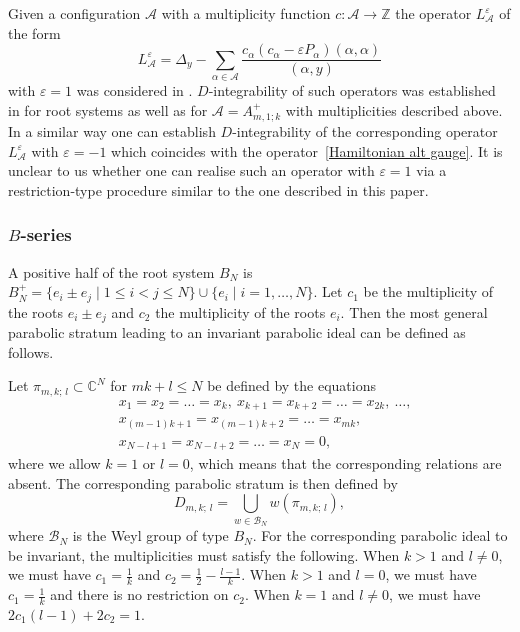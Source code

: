 \documentclass[12pt]{amsart}
\numberwithin{equation}{section}
\theoremstyle{definition}
\begin{document}
Given a configuration $\mathcal A$ with a multiplicity function $c\colon {\mathcal A}\to {\mathbb Z}$ the operator 
$L_{\mathcal A}^\varepsilon$ of the form 
\begin{equation}
\label{Lepsilon}
L_{\mathcal A}^\varepsilon=\Delta_y - \sum_{\alpha\in \mathcal A} \frac{c_\alpha(c_\alpha - \varepsilon P_\alpha)(\alpha, \alpha)}{(\alpha,y)} 
\end{equation}
with $\varepsilon =1$ 
was considered in \cite{CGV}. $D$-integrability of such operators was established in \cite{CGV} for root systems as well as for ${\mathcal A}=A^+_{m,1; k}$ with multiplicities described above. In a similar way one can establish $D$-integrability of the corresponding operator $L_{\mathcal A}^\varepsilon$ with $\varepsilon=-1$ which coincides with the operator~\eqref{Hamiltonian alt gauge}. It is unclear to us whether one can realise such an operator with $\varepsilon =1$ via a restriction-type procedure similar to the one described in this paper. 


\subsubsection{$B$-series}\label{rat type B}
A positive half of the root system $B_N$ is $B_N^+ = \{ e_i \pm e_j \mid 1 \leq i < j \leq N\} \cup \{ e_i  \mid i= 1, \dots, N\}$.
Let $c_1$ be the multiplicity of the roots $e_i \pm e_j$ and $c_2$ the multiplicity of the roots $e_i$. Then the most general parabolic 
stratum leading to an invariant parabolic ideal can be defined as follows. 

Let $\pi_{m,k;\, l} \subset \mathbb{C}^N$ for $mk+l \leq N$ be defined by the equations
\begin{align*}
    &x_1 = x_2 = \dots = x_k, \ x_{k+1} = x_{k + 2} = \dots = x_{2k}, \ \dots, \\
    &x_{(m-1)k+1} = x_{(m-1)k+2} = \dots = x_{mk}, \\
    &x_{N - l + 1} = x_{N - l + 2} = \dots = x_{N} = 0,    
\end{align*}
where we allow $k=1$ or $l=0$, which means that the corresponding relations are absent. The corresponding parabolic stratum is then defined by
\begin{equation*}
    D_{m,k; \, l} = \bigcup\limits_{w \in \mathcal{B}_N} w(\pi_{m,k; \, l}),
\end{equation*}
where $\mathcal{B}_N$ is the Weyl group of type $B_N$.
For the corresponding parabolic ideal to be invariant,
the multiplicities must satisfy the following. When $k > 1$ and $l \neq 0$, we must have $c_1 = \frac{1}{k}$ and $c_2 = \frac{1}{2} - \frac{l - 1}{k}$. When $k > 1$ and $l = 0$, we must have $c_1 = \frac{1}{k}$ and there is no restriction on $c_2$. When $k = 1$ and $l \neq 0$, we must have $2c_1(l-1) + 2c_2 = 1$.
\end{document}
